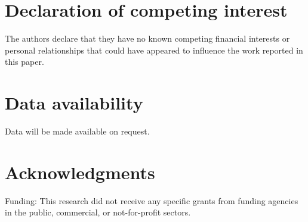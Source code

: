 \documentclass[a4paper,7pt,fleqn]{article}   %
\begin{document}
\begin{multicols}{2}
		\section*{Declaration of competing interest}
		The authors declare that they have no known competing financial
		interests or personal relationships that could have appeared to influence
		the work reported in this paper.
		
		\section*{Data availability}
		Data will be made available on request.
		
		\section*{Acknowledgments}
		Funding: This research did not receive any specific grants from
		funding agencies in the public, commercial, or not-for-profit sectors.
		

\end{multicols}
\end{document}
